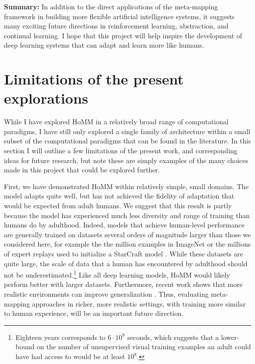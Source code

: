 \textbf{Summary:} In addition to the direct applications of the meta-mapping framework in building more flexible artificial intelligence systems, it suggests many exciting future directions in reinforcement learning, abstraction, and continual learning. I hope that this project will help inspire the development of deep learning systems that can adapt and learn more like humans. \par 

\section{Limitations of the present explorations}

While I have explored HoMM in a relatively broad range of computational paradigms, I have still only explored a single family of architecture within a small subset of the computational paradigms that can be found in the literature. In this section I will outline a few limitations of the present work, and corresponding ideas for future research, but note these are simply examples of the many choices made in this project that could be explored further. \par

First, we have demonstrated HoMM within relatively simple, small domains. The model adapts quite well, but has not achieved the fidelity of adaptation that would be expected from adult humans. We suggest that this result is partly because the model has experienced much less diversity and range of training than humans do by adulthood. Indeed, models that achieve human-level performance are generally trained on datasets several orders of magnitude larger than those we considered here, for example the the million examples in ImageNet \citep{Deng2009} or the millions of expert replays used to initialize a StarCraft model \citep{Vinyals2019}. While these datasets are quite large, the scale of data that a human has encountered by adulthood should not be underestimated.\footnote{Eighteen years corresponds to \(6 \cdot 10^8\) seconds, which suggests that a lower-bound on the number of unsupervised visual training examples an adult could have had access to would be at least \(10^8\).} Like all deep learning models, HoMM would likely perform better with larger datasets. Furthermore, recent work shows that more realistic environments can improve generalization \citep{Hill2019a}. Thus, evaluating meta-mapping approaches in richer, more realistic settings, with training more similar to human experience, will be an important future direction. \par

